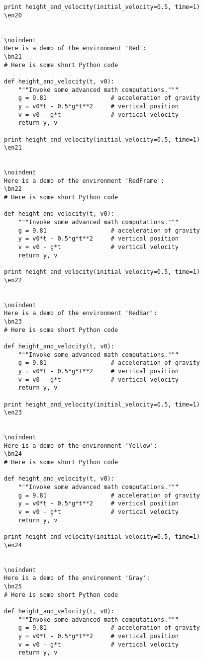 \documentclass[a4paper,11pt]{article}
\begin{document}
{{{{{{{{{{{\begin{Verbatim}
print height_and_velocity(initial_velocity=0.5, time=1)
\en20


\noindent
Here is a demo of the environment 'Red':
\bn21
# Here is some short Python code

def height_and_velocity(t, v0):
    """Invoke some advanced math computations."""
    g = 9.81                  # acceleration of gravity
    y = v0*t - 0.5*g*t**2     # vertical position
    v = v0 - g*t              # vertical velocity
    return y, v

print height_and_velocity(initial_velocity=0.5, time=1)
\en21


\noindent
Here is a demo of the environment 'RedFrame':
\bn22
# Here is some short Python code

def height_and_velocity(t, v0):
    """Invoke some advanced math computations."""
    g = 9.81                  # acceleration of gravity
    y = v0*t - 0.5*g*t**2     # vertical position
    v = v0 - g*t              # vertical velocity
    return y, v

print height_and_velocity(initial_velocity=0.5, time=1)
\en22


\noindent
Here is a demo of the environment 'RedBar':
\bn23
# Here is some short Python code

def height_and_velocity(t, v0):
    """Invoke some advanced math computations."""
    g = 9.81                  # acceleration of gravity
    y = v0*t - 0.5*g*t**2     # vertical position
    v = v0 - g*t              # vertical velocity
    return y, v

print height_and_velocity(initial_velocity=0.5, time=1)
\en23


\noindent
Here is a demo of the environment 'Yellow':
\bn24
# Here is some short Python code

def height_and_velocity(t, v0):
    """Invoke some advanced math computations."""
    g = 9.81                  # acceleration of gravity
    y = v0*t - 0.5*g*t**2     # vertical position
    v = v0 - g*t              # vertical velocity
    return y, v

print height_and_velocity(initial_velocity=0.5, time=1)
\en24


\noindent
Here is a demo of the environment 'Gray':
\bn25
# Here is some short Python code

def height_and_velocity(t, v0):
    """Invoke some advanced math computations."""
    g = 9.81                  # acceleration of gravity
    y = v0*t - 0.5*g*t**2     # vertical position
    v = v0 - g*t              # vertical velocity
    return y, v


\end{Verbatim}}}}}}}}}}}}
\end{document}
